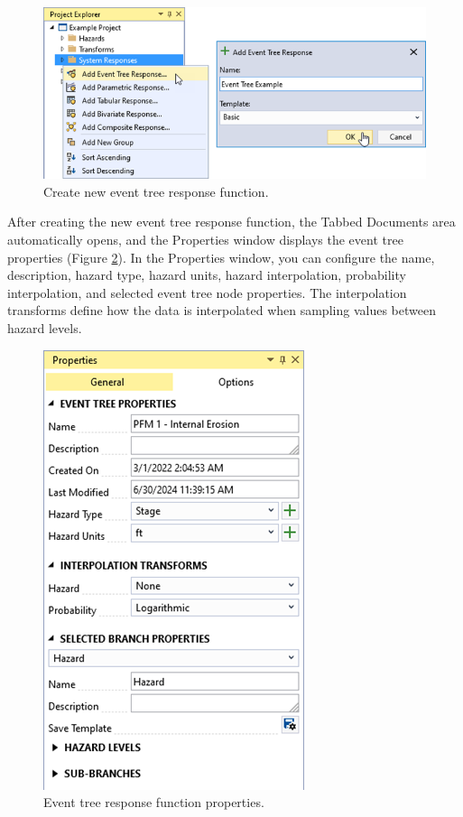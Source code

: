 \documentclass[
]{book}
\begin{document}
\begin{figure}

{\centering \includegraphics{images/figure84} 

}

\caption{Create new event tree response function.}\label{fig:figure-84}
\end{figure}

After creating the new event tree response function, the Tabbed Documents area automatically opens, and the Properties window displays the event tree properties (Figure \ref{fig:figure-85}). In the Properties window, you can configure the name, description, hazard type, hazard units, hazard interpolation, probability interpolation, and selected event tree node properties. The interpolation transforms define how the data is interpolated when sampling values between hazard levels.

\begin{figure}

{\centering \includegraphics{images/figure85} 

}

\caption{Event tree response function properties.}\label{fig:figure-85}
\end{figure}
\end{document}
